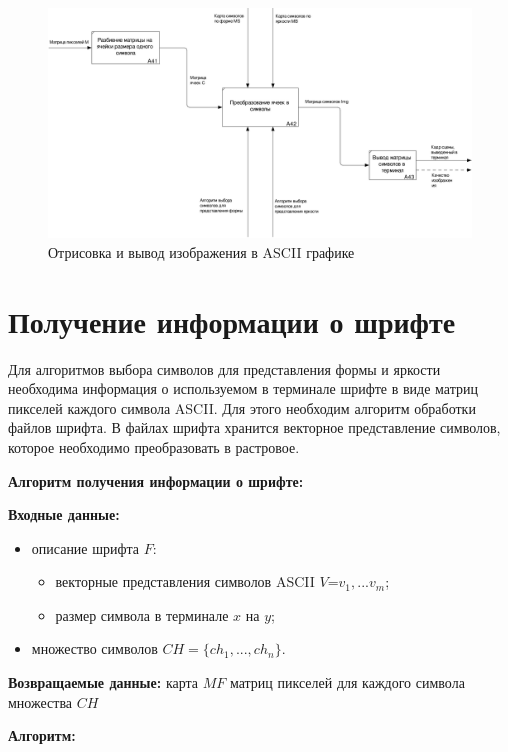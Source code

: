 \begin{figure}[H]
    \centering
    \includegraphics[scale=0.2]{images/04_A4.png}
    \caption{Отрисовка и вывод изображения в ASCII графике}
    \label{fig:idef0-3}
\end{figure}

\section{Получение информации о шрифте}

Для алгоритмов выбора символов для представления формы и яркости необходима информация о используемом в терминале шрифте в виде матриц пикселей каждого символа ASCII. Для этого необходим алгоритм обработки файлов шрифта. В файлах шрифта хранится векторное представление символов, которое необходимо преобразовать в растровое.~\cite{ttf}

\textbf{Алгоритм получения информации о шрифте:}

\textbf{Входные данные:}
\begin{itemize}
    \item описание шрифта $F$:
    \begin{itemize}
        \item векторные представления символов ASCII $V$=$v_1, ... v_m$;
        \item размер символа в терминале $x$ на $y$;
    \end{itemize}
    \item множество символов $CH=\{ch_1, ..., ch_n\}$.
\end{itemize}

\textbf{Возвращаемые данные:} карта $MF$ матриц пикселей для каждого символа множества $CH$

\textbf{Алгоритм:}

